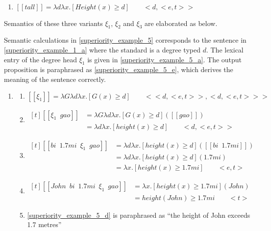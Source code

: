 \documentclass{ctexart}
\begin{document}
\begin{enumerate}
    \item \label{tallLE_re_re}
    $[\![tall]\!]=\lambda d \lambda x.[Height(x) \geq d] \qquad <d,<e,t>>$
\end{enumerate}

Semantics of these three variants $\xi_1$, $\xi_2$ and $\xi_3$ are elaborated as below.

Semantic calculations in \ref{superiority_example_5} corresponds to the sentence in \ref{superiority_example_1_a} where the standard is a degree typed $d$. The lexical entry of the degree head $\xi_1$ is given in \ref{superiority_example_5_a}. The output proposition is paraphrased as \ref{superiority_example_5_e}, which derives the meaning of the sentence correctly.

\begin{enumerate}
    \item \label{superiority_example_5}
    \begin{enumerate}
        \item \label{superiority_example_5_a}
        $[\![\xi_1]\!] = \lambda G \lambda d \lambda x.[G(x) \geq d] \qquad <<d,<e,t>>,<d,<e,t>>>$

        \item \label{superiority_example_5_b}
        $\begin{aligned}[t]
            [\![\xi_1 \enspace gao]\!] &= \lambda G \lambda d \lambda x.[G(x) \geq d]([\![gao]\!]) \\
            &= \lambda d \lambda x.[height(x) \geq d] \qquad <d,<e,t>>
        \end{aligned}$

        \item \label{superiority_example_5_c}
        $\begin{aligned}[t]
            [\![bi \enspace 1.7mi \enspace \xi_1 \enspace gao]\!] &= \lambda d \lambda x.[height(x) \geq d]([\![bi \enspace 1.7mi]\!]) \\
            &= \lambda d \lambda x.[height(x) \geq d](1.7mi) \\
            &= \lambda x.[height(x) \geq 1.7mi] \qquad <e,t>
        \end{aligned}$

        \item \label{superiority_example_5_d}
        $\begin{aligned}[t]
            [\![John \enspace bi \enspace 1.7mi \enspace \xi_1 \enspace gao]\!] &= \lambda x.[height(x) \geq 1.7mi](John) \\
            &= height(John) \geq 1.7mi \qquad <t>
        \end{aligned}$

        \item \label{superiority_example_5_e}
        \ref{superiority_example_5_d} is paraphrased as ``the height of John exceeds 1.7 metres''

    \end{enumerate}
\end{enumerate}
\end{document}
